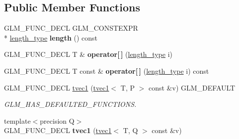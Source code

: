 \subsection*{Public Member Functions}
\begin{DoxyCompactItemize}
\item 
\hypertarget{structglm_1_1tvec1_aed7560c688cc1192598e87368ee3a2aa}{G\-L\-M\-\_\-\-F\-U\-N\-C\-\_\-\-D\-E\-C\-L G\-L\-M\-\_\-\-C\-O\-N\-S\-T\-E\-X\-P\-R \\*
\hyperlink{structglm_1_1tvec1_ae6254cf662020a8328b744b40f419527}{length\-\_\-type} {\bfseries length} () const }\label{structglm_1_1tvec1_aed7560c688cc1192598e87368ee3a2aa}

\item 
\hypertarget{structglm_1_1tvec1_a51ab9cbe89195b12a6f12e5f7fb11636}{G\-L\-M\-\_\-\-F\-U\-N\-C\-\_\-\-D\-E\-C\-L T \& {\bfseries operator\mbox{[}$\,$\mbox{]}} (\hyperlink{structglm_1_1tvec1_ae6254cf662020a8328b744b40f419527}{length\-\_\-type} i)}\label{structglm_1_1tvec1_a51ab9cbe89195b12a6f12e5f7fb11636}

\item 
\hypertarget{structglm_1_1tvec1_a3e8b203a7c85a57d4d02a77e5b408f0b}{G\-L\-M\-\_\-\-F\-U\-N\-C\-\_\-\-D\-E\-C\-L T const \& {\bfseries operator\mbox{[}$\,$\mbox{]}} (\hyperlink{structglm_1_1tvec1_ae6254cf662020a8328b744b40f419527}{length\-\_\-type} i) const }\label{structglm_1_1tvec1_a3e8b203a7c85a57d4d02a77e5b408f0b}

\item 
\hypertarget{structglm_1_1tvec1_a85157796c63cc7e3274978652d4a35bd}{G\-L\-M\-\_\-\-F\-U\-N\-C\-\_\-\-D\-E\-C\-L \hyperlink{structglm_1_1tvec1_a85157796c63cc7e3274978652d4a35bd}{tvec1} (\hyperlink{structglm_1_1tvec1}{tvec1}$<$ T, P $>$ const \&v) G\-L\-M\-\_\-\-D\-E\-F\-A\-U\-L\-T}\label{structglm_1_1tvec1_a85157796c63cc7e3274978652d4a35bd}

\begin{DoxyCompactList}\small\item\em G\-L\-M\-\_\-\-H\-A\-S\-\_\-\-D\-E\-F\-A\-U\-L\-T\-E\-D\-\_\-\-F\-U\-N\-C\-T\-I\-O\-N\-S. \end{DoxyCompactList}\item 
\hypertarget{structglm_1_1tvec1_aed34e6b477b4a8ce31f6eda0a4697aad}{{\footnotesize template$<$precision Q$>$ }\\G\-L\-M\-\_\-\-F\-U\-N\-C\-\_\-\-D\-E\-C\-L {\bfseries tvec1} (\hyperlink{structglm_1_1tvec1}{tvec1}$<$ T, Q $>$ const \&v)}\label{structglm_1_1tvec1_aed34e6b477b4a8ce31f6eda0a4697aad}


\end{DoxyCompactItemize}
